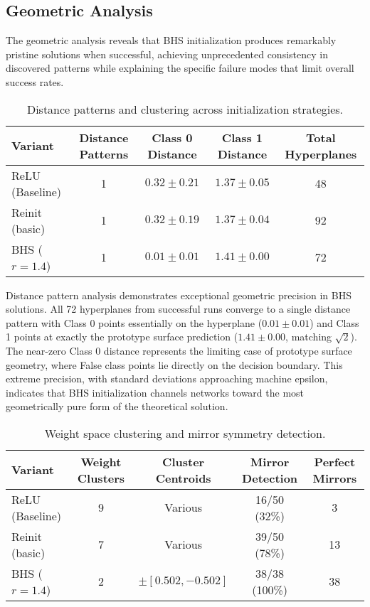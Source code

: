 
\subsection*{Geometric Analysis}

The geometric analysis reveals that BHS initialization produces remarkably pristine solutions when successful, achieving unprecedented consistency in discovered patterns while explaining the specific failure modes that limit overall success rates.

\begin{table}[ht]
\centering
\caption{Distance patterns and clustering across initialization strategies.}
\label{tab:relu1-bhs-geometry}
\begin{tabular}{lcccc}
\toprule
Variant & Distance Patterns & Class 0 Distance & Class 1 Distance & Total Hyperplanes \\
\midrule
ReLU (Baseline) & 1 & $0.32 \pm 0.21$ & $1.37 \pm 0.05$ & 48 \\
Reinit (basic) & 1 & $0.32 \pm 0.19$ & $1.37 \pm 0.04$ & 92 \\
BHS ($r=1.4$) & 1 & $0.01 \pm 0.01$ & $1.41 \pm 0.00$ & 72 \\
\bottomrule
\end{tabular}
\end{table}

Distance pattern analysis demonstrates exceptional geometric precision in BHS solutions. All 72 hyperplanes from successful runs converge to a single distance pattern with Class 0 points essentially on the hyperplane ($0.01 \pm 0.01$) and Class 1 points at exactly the prototype surface prediction ($1.41 \pm 0.00$, matching $\sqrt{2}$). The near-zero Class 0 distance represents the limiting case of prototype surface geometry, where False class points lie directly on the decision boundary. This extreme precision, with standard deviations approaching machine epsilon, indicates that BHS initialization channels networks toward the most geometrically pure form of the theoretical solution.

\begin{table}[ht]
\centering
\caption{Weight space clustering and mirror symmetry detection.}
\label{tab:relu1-bhs-weights}
\begin{tabular}{lcccc}
\toprule
Variant & Weight Clusters & Cluster Centroids & Mirror Detection & Perfect Mirrors \\
\midrule
ReLU (Baseline) & 9 & Various & 16/50 (32\%) & 3 \\
Reinit (basic) & 7 & Various & 39/50 (78\%) & 13 \\
BHS ($r=1.4$) & 2 & $\pm[0.502, -0.502]$ & 38/38 (100\%) & 38 \\
\bottomrule
\end{tabular}
\end{table}

